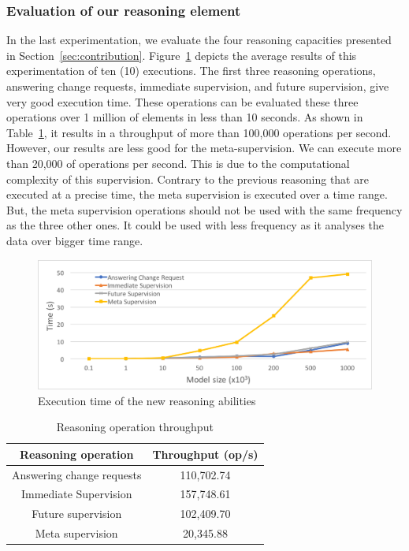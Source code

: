 \subsubsection{Evaluation of our reasoning element}

In the last experimentation, we evaluate the four reasoning capacities presented in Section~\ref{sec:contribution}.
Figure~\ref{fig:eval-reasoning} depicts the average results of this experimentation of ten (10) executions.
The first three reasoning operations, answering change requests, immediate supervision, and future supervision, give very good execution time.
These operations can be evaluated these three operations over 1 million of elements in less than 10 seconds.
As shown in Table~\ref{table:persistenMemory}, it results in a throughput of more than 100,000 operations per second.
However, our results are less good for the meta-supervision.
We can execute more than 20,000 of operations per second.
This is due to the computational complexity of this supervision.
Contrary to the previous reasoning that are executed at a precise time, the meta supervision is executed over a time range.
But, the meta supervision operations should not be used with the same frequency as the three other ones.
It could be used with less frequency as it analyses the data over bigger time range.


\begin{figure}
	\includegraphics[width=\linewidth]{img/chapt-tkm/validation/eval}
	\caption{Execution time of the new reasoning abilities}
	\label{fig:eval-reasoning}
\end{figure}

\begin{table}

\caption{Reasoning operation throughput} 
\label{table:persistenMemory} 

\centering
\begin{tabular}{|c|c|}

\hline
Reasoning operation & Throughput (op/s)\\
\hline
Answering change requests & 110,702.74	 \\
\hline
Immediate Supervision & 157,748.61	 \\
\hline
Future supervision & 102,409.70	\\
\hline
Meta supervision & 20,345.88	 \\
\hline

\end{tabular}

\end{table}


